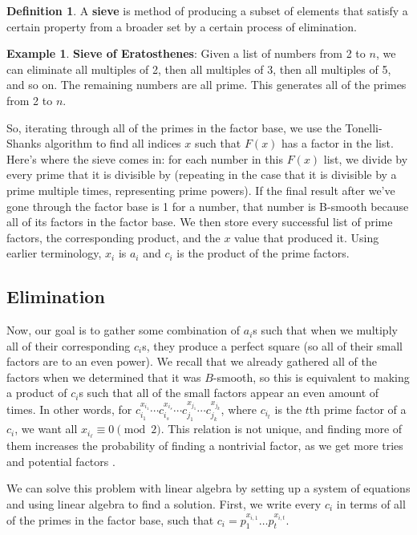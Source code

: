 \documentclass[11pt,reqno]{amsart}
\theoremstyle{definition}
\newtheorem{definition}[theorem]{Definition}
\newtheorem{example}[theorem]{Example}
\begin{document}
\begin{definition}
   A \textbf{sieve} is method of producing a subset of elements that satisfy a certain property from a broader set by a certain process of elimination.
\end{definition} 

\begin{example}
   \textbf{Sieve of Eratosthenes}: Given a list of numbers from 2 to $n$, we can eliminate all multiples of 2, then all multiples of 3, then all multiples of 5, and so on. The remaining numbers are all prime. This generates all of the primes from 2 to $n$. 
\end{example}

So, iterating through all of the primes in the factor base, we use the Tonelli-Shanks algorithm to find all indices $x$ such that $F(x)$ has a factor in the list. Here's where the sieve comes in: for each number in this $F(x)$ list, we divide by every prime that it is divisible by (repeating in the case that it is divisible by a prime multiple times, representing prime powers). If the final result after we've gone through the factor base is 1 for a number, that number is B-smooth because all of its factors in the factor base. We then store every successful list of prime factors, the corresponding product, and the $x$ value that produced it. Using earlier terminology, $x_i$ is $a_i$ and $c_i$ is the product of the prime factors. 

\subsection{Elimination}
Now, our goal is to gather some combination of $a_i$s such that when we multiply all of their corresponding $c_i$s, they produce a perfect square (so all of their small factors are to an even power). We recall that we already gathered all of the factors when we determined that it was $B$-smooth, so this is equivalent to making a product of $c_i$s such that all of the small factors appear an even amount of times. In other words, for $c_{i_1}^{x_{i_1}} \cdots c_{i_s}^{x_{i_s}} \cdots c_{j_1}^{x_{j_1}} \cdots c_{j_k}^{x_{j_k}}$, where $c_{i_t}$ is the $t$th prime factor of a $c_i$, we want all $x_{i_\ell} \equiv 0 \pmod{2}$. This relation is not unique, and finding more of them increases the probability of finding a nontrivial factor, as we get more tries and potential factors \cite{silverman2008introduction}. 

We can solve this problem with linear algebra by setting up a system of equations and using linear algebra to find a solution. First, we write every $c_i$ in terms of all of the primes in the factor base, such that $c_i = p_1^{x_{i,1}} \ldots p_t^{x_{i, t}}$. 
\end{document}
